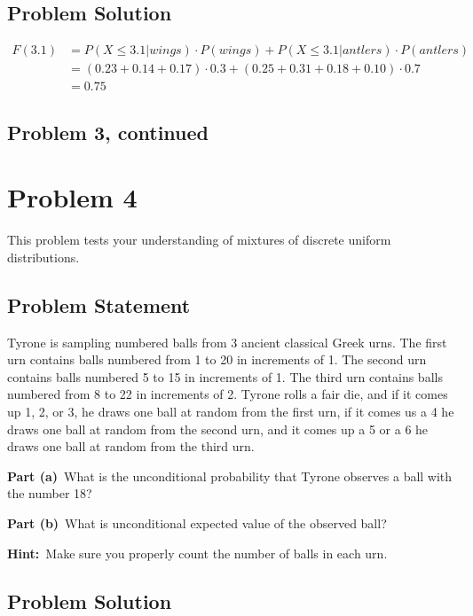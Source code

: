 \documentclass[12pt]{article}
\theoremstyle{definition}
\begin{document}
\subsection*{Problem Solution}
\begin{align*}
F(3.1) &= P(X \leq 3.1|wings)\cdot P(wings) + P(X \leq 3.1|antlers)\cdot P(antlers)\\
&= (0.23 + 0.14 + 0.17)\cdot 0.3 + (0.25 + 0.31 + 0.18 + 0.10) \cdot 0.7\\
&= 0.75
\end{align*}

\newpage
\subsection*{Problem 3, continued}





\newpage
\section*{Problem 4}

This problem tests your understanding of mixtures of discrete uniform distributions.

\subsection*{Problem Statement}

Tyrone is sampling numbered balls from 3 ancient classical Greek urns. The first urn contains balls numbered from 1 to 20 in increments of 1. The second urn contains balls numbered 5 to 15 in increments of 1. The third urn contains balls numbered from 8 to 22 in increments of 2. Tyrone rolls a fair die, and if it comes up 1, 2, or 3, he draws one ball at random from the first urn, if it comes us a 4 he draws one ball at random from the second urn, and it comes up a 5 or a 6 he draws one ball at random from the third urn.

\bigskip
\noindent
{\bf Part (a)}\ What is the unconditional probability that Tyrone observes a ball with the number 18?

\bigskip
\noindent
{\bf Part (b)}\ What is unconditional expected value of the observed ball?

\bigskip
\noindent
{\bf Hint:}\ Make sure you properly count the number of balls in each urn.

\subsection*{Problem Solution}
\end{document}
